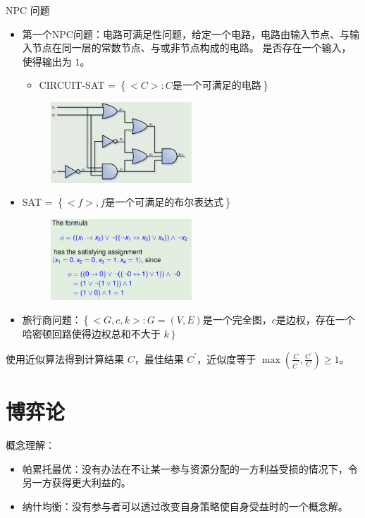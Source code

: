 \begin{remark}
    NPC 问题\begin{itemize}
        \item 第一个NPC问题：电路可满足性问题，给定一个电路，电路由输入节点、与输入节点在同一层的常数节点、与或非节点构成的电路。 是否存在一个输入，使得输出为 $1$。\begin{itemize}
            \item CIRCUIT-SAT = $\left\{<C>:C\text{是一个可满足的电路}\right\}$
        \end{itemize}
        \begin{figure}[htbp]
            \centering
            \includegraphics[width=0.5\textwidth]{./figure/fig3.png}
        \end{figure}
        \item SAT = $\left\{<f>, f\text{是一个可满足的布尔表达式}\right\}$
        \begin{figure}[htbp]
            \centering
            \includegraphics[width=0.5\textwidth]{./figure/fig4.png}
        \end{figure}
        \item 旅行商问题：$\left\{<G, c, k>: G=(V, E)\text{是一个完全图，}c\text{是边权}\right.$，存在一个哈密顿回路使得边权总和不大于 $k\left.\right\}$
    \end{itemize}
\end{remark}

\begin{remark}
    使用近似算法得到计算结果 $C$，最佳结果 $C^\prime$，近似度等于 $\max(\frac{C}{C^\prime}, \frac{C^\prime}{C}) \ge 1$。
\end{remark}


\section{博弈论}
\begin{remark}
    概念理解：
    \begin{itemize}
        \item 帕累托最优：没有办法在不让某一参与资源分配的一方利益受损的情况下，令另一方获得更大利益的。
        \item 纳什均衡：没有参与者可以透过改变自身策略使自身受益时的一个概念解。
    \end{itemize}
\end{remark}

